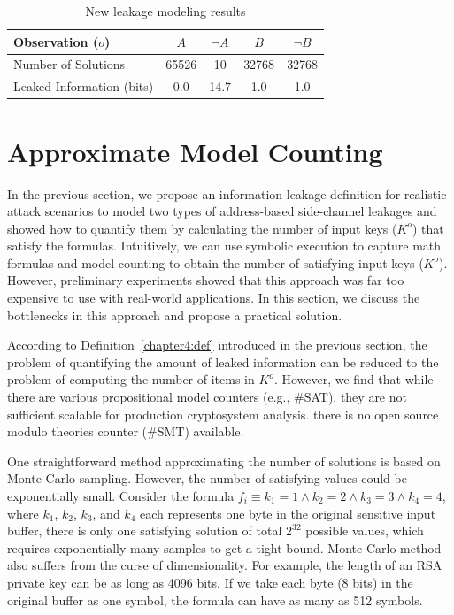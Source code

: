 \begin{table}[ht]
    \centering\small\footnotesize
    \caption{New leakage modeling results}
    \label{shtable2}
    \vspace*{-9pt}
    \begin{tabular}{l|cc|cc}
        \hline

        Observation ($o$)         & $A$   & $\neg A$ & $B$   & $\neg B$ \\ \hline
        Number of Solutions       & 65526 & 10       & 32768 & 32768    \\ \hline
        Leaked Information (bits) & 0.0   & 14.7     & 1.0   & 1.0      \\
        \hline
    \end{tabular}
\end{table}

\section{Approximate Model Counting}
\label{MCreasons}
In the previous section, we propose an information leakage definition for realistic attack scenarios to model two types of address-based side-channel leakages and showed how to quantify them by calculating the number of input keys ($K^o$) that satisfy the formulas. Intuitively, we can use symbolic execution to capture math formulas and model counting to obtain the number of satisfying input keys ($K^o$). However, preliminary experiments showed that this approach was far too expensive to use with real-world applications. In this section, we discuss the bottlenecks in this approach and propose a practical solution.


According to Definition~\ref{chapter4:def} introduced in the previous section,
the problem of quantifying the amount of leaked information can be reduced to
the problem of computing the number of items in $K^o$. However, we find that while
there are various propositional model counters (e.g., \#SAT), they are not
sufficient scalable for production cryptosystem analysis.
there is no open source modulo theories counter (\#SMT) available.

One straightforward method approximating the number of solutions is based on Monte Carlo
sampling. However, the number of satisfying values could be exponentially small.
Consider the formula $f_i\equiv{k_1} = 1\land{k_2} = 2\land{k_3} = 3\land{k_4} =
    4$, where $k_1$, $k_2$, $k_3$, and $k_4$ each represents one byte in the
original sensitive input buffer, there is only one satisfying solution of total
$2^{32}$ possible values, which requires exponentially many samples to get a
tight bound. Monte Carlo method also suffers from the curse of dimensionality.
For example, the length of an RSA private key can be as long as 4096 bits. If we
take each byte (8 bits) in the original buffer as one symbol, the formula can
have as many as 512 symbols.

